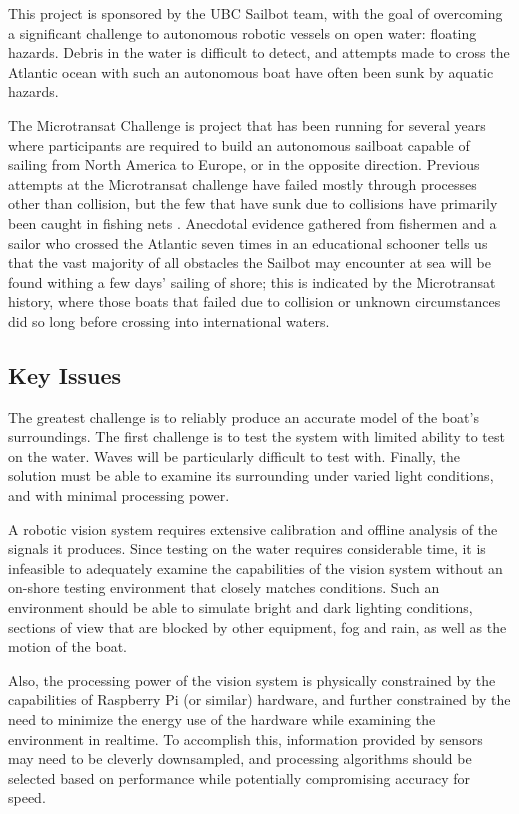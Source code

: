 This project is sponsored by the UBC Sailbot team, with the goal of overcoming a significant challenge to autonomous robotic vessels on open water: floating hazards. Debris in the water is difficult to detect, and attempts made to cross the Atlantic ocean with such an autonomous boat have often been sunk by aquatic hazards.

The Microtransat Challenge \cite{transat-history} is project that has been running for several years where participants are required to build an autonomous sailboat capable of sailing from North America to Europe, or in the opposite direction. Previous attempts at the Microtransat challenge have failed mostly through processes other than collision, but the few that have sunk due to collisions have primarily been caught in fishing nets \cite{transat-history}. Anecdotal evidence gathered from fishermen and a sailor who crossed the Atlantic seven times in an educational schooner tells us that the vast majority of all obstacles the Sailbot may encounter at sea will be found withing a few days' sailing of shore; this is indicated by the Microtransat history, where those boats that failed due to collision or unknown circumstances did so long before crossing into international waters.


\subsection{\label{sec:intro:key-issues}Key Issues}
The greatest challenge is to reliably produce an accurate model of the boat's surroundings. The first challenge is to test the system with limited ability to test on the water.  Waves will be particularly difficult to test with.  Finally, the solution must be able to examine its surrounding under varied light conditions, and with minimal processing power.

A robotic vision system requires extensive calibration and offline analysis of the signals it produces. Since testing on the water requires considerable time, it is infeasible to adequately examine the capabilities of the vision system without an on-shore testing environment that closely matches conditions. Such an environment should be able to simulate bright and dark lighting conditions, sections of view that are blocked by other equipment, fog and rain, as well as the motion of the boat.

Also, the processing power of the vision system is physically constrained by the capabilities of Raspberry Pi (or similar) hardware, and further constrained by the need to minimize the energy use of the hardware while examining the environment in realtime. To accomplish this, information provided by sensors may need to be cleverly downsampled, and processing algorithms should be selected based on performance while potentially compromising accuracy for speed.


